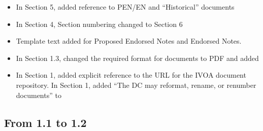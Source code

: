 \documentclass[11pt,a4paper]{ivoa}
\begin{document}
\begin{itemize}
\item In Section 5, added reference to PEN/EN and “Historical” documents
\item In Section 4, Section numbering changed to Section 6
\item Template text added for Proposed Endorsed Notes and Endorsed Notes.
\item In Section 1.3, changed the required format for documents to PDF and
added
\item In Section 1, added explicit reference to the URL for the IVOA document
repository.  In Section 1, added “The DC may reformat, rename, or
renumber documents” to
\end{itemize}

\subsection{From 1.1 to 1.2}
\end{document}
